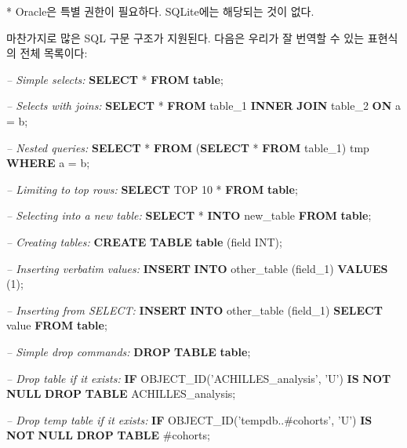 \documentclass[11pt]{book}
\newenvironment{Shaded}{\begin{snugshade}}{\end{snugshade}}
\newcommand{\KeywordTok}[1]{\textcolor[rgb]{0.13,0.29,0.53}{\textbf{#1}}}
\newcommand{\DataTypeTok}[1]{\textcolor[rgb]{0.13,0.29,0.53}{#1}}
\newcommand{\DecValTok}[1]{\textcolor[rgb]{0.00,0.00,0.81}{#1}}
\newcommand{\StringTok}[1]{\textcolor[rgb]{0.31,0.60,0.02}{#1}}
\newcommand{\CommentTok}[1]{\textcolor[rgb]{0.56,0.35,0.01}{\textit{#1}}}
\newcommand{\FunctionTok}[1]{\textcolor[rgb]{0.00,0.00,0.00}{#1}}
\newcommand{\NormalTok}[1]{#1}
\theoremstyle{definition}
\theoremstyle{definition}
\theoremstyle{definition}
\theoremstyle{remark}
\begin{document}
* Oracle은 특별 권한이 필요하다. SQLite에는 해당되는 것이 없다.

마찬가지로 많은 SQL 구문 구조가 지원된다. 다음은 우리가 잘 번역할 수
있는 표현식의 전체 목록이다:

\begin{Shaded}
\begin{Highlighting}[]
\CommentTok{-- Simple selects:}
\KeywordTok{SELECT}\NormalTok{ * }\KeywordTok{FROM} \KeywordTok{table}\NormalTok{;}

\CommentTok{-- Selects with joins:}
\KeywordTok{SELECT}\NormalTok{ * }\KeywordTok{FROM}\NormalTok{ table_1 }\KeywordTok{INNER} \KeywordTok{JOIN}\NormalTok{ table_2 }\KeywordTok{ON}\NormalTok{ a = b;}

\CommentTok{-- Nested queries:}
\KeywordTok{SELECT}\NormalTok{ * }\KeywordTok{FROM}\NormalTok{ (}\KeywordTok{SELECT}\NormalTok{ * }\KeywordTok{FROM}\NormalTok{ table_1) tmp }\KeywordTok{WHERE}\NormalTok{ a = b;}

\CommentTok{-- Limiting to top rows:}
\KeywordTok{SELECT}\NormalTok{ TOP }\DecValTok{10}\NormalTok{ * }\KeywordTok{FROM} \KeywordTok{table}\NormalTok{;}

\CommentTok{-- Selecting into a new table:}
\KeywordTok{SELECT}\NormalTok{ * }\KeywordTok{INTO}\NormalTok{ new_table }\KeywordTok{FROM} \KeywordTok{table}\NormalTok{;}

\CommentTok{-- Creating tables:}
\KeywordTok{CREATE} \KeywordTok{TABLE} \KeywordTok{table}\NormalTok{ (field }\DataTypeTok{INT}\NormalTok{);}

\CommentTok{-- Inserting verbatim values:}
\KeywordTok{INSERT} \KeywordTok{INTO}\NormalTok{ other_table (field_1) }\KeywordTok{VALUES}\NormalTok{ (}\DecValTok{1}\NormalTok{);}

\CommentTok{-- Inserting from SELECT:}
\KeywordTok{INSERT} \KeywordTok{INTO}\NormalTok{ other_table (field_1) }\KeywordTok{SELECT} \FunctionTok{value} \KeywordTok{FROM} \KeywordTok{table}\NormalTok{;}
  
\CommentTok{-- Simple drop commands:}
\KeywordTok{DROP} \KeywordTok{TABLE} \KeywordTok{table}\NormalTok{;}

\CommentTok{-- Drop table if it exists:}
\KeywordTok{IF}\NormalTok{ OBJECT_ID(}\StringTok{'ACHILLES_analysis'}\NormalTok{, }\StringTok{'U'}\NormalTok{) }\KeywordTok{IS} \KeywordTok{NOT} \KeywordTok{NULL}
  \KeywordTok{DROP} \KeywordTok{TABLE}\NormalTok{ ACHILLES_analysis;}
  
\CommentTok{-- Drop temp table if it exists:}
\KeywordTok{IF}\NormalTok{ OBJECT_ID(}\StringTok{'tempdb..#cohorts'}\NormalTok{, }\StringTok{'U'}\NormalTok{) }\KeywordTok{IS} \KeywordTok{NOT} \KeywordTok{NULL}
  \KeywordTok{DROP} \KeywordTok{TABLE}\NormalTok{ #cohorts;  }


\end{Highlighting}
\end{Shaded}
\end{document}
